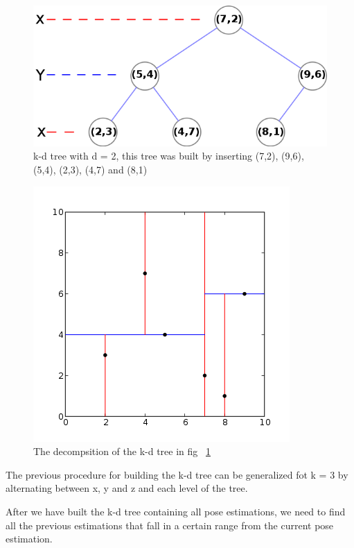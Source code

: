 \begin{figure}[H]
\centering
\includegraphics[scale=0.6,keepaspectratio=true]{Loop/kdtree_build_2.png}
\caption{k-d tree with d = 2, this tree was built by inserting (7,2), (9,6), (5,4), (2,3), (4,7) and (8,1)}
\label{fig:kdtree_build_2}
\end{figure}

\begin{figure}[H]
\centering
\includegraphics {Loop/kdtree_build_1.png}
\caption{The decompsition of the k-d tree in  fig ~\ref{fig:kdtree_build_2}}
\label{fig:kdtree_build_1}
\end{figure}

The previous procedure for building the k-d tree can be generalized fot k = 3 by alternating between x, y and z and each level of the tree.

After we have built the k-d tree containing all pose estimations, we need to find all the previous estimations that fall in a certain range from the current pose estimation.

